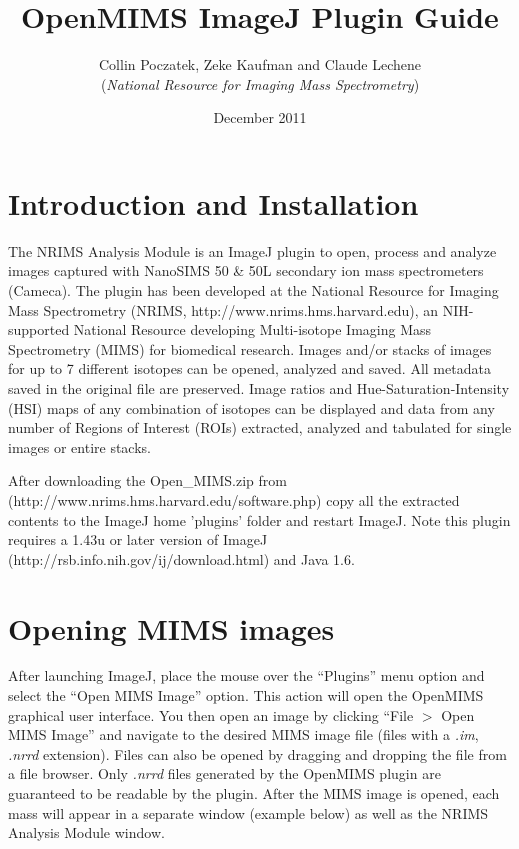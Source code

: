 \documentclass{article}
\title{\textbf{OpenMIMS ImageJ Plugin Guide}}
\date {December 2011}
\author{Collin Poczatek, Zeke Kaufman and Claude Lechene \\(\textit{National Resource for Imaging Mass Spectrometry})}
\begin{document}
\maketitle

\section*{Introduction and Installation }
	The NRIMS Analysis Module is an ImageJ plugin to open, process and analyze images captured with
	NanoSIMS 50 \& 50L secondary ion mass spectrometers (Cameca). The plugin has been developed at the
	National Resource for Imaging Mass Spectrometry (NRIMS, http://www.nrims.hms.harvard.edu), an 
	NIH-supported National Resource developing Multi-isotope Imaging Mass Spectrometry (MIMS) for
	biomedical research. Images and/or stacks of images for up to 7 different isotopes can be opened, 
	analyzed and saved. All metadata saved in the original file are preserved. Image ratios and 
	Hue-Saturation-Intensity (HSI) maps of any combination of isotopes can be displayed and data 
	from any number of Regions of Interest (ROIs) extracted, analyzed and tabulated for single images 
	or entire stacks. 

	After downloading the Open\_MIMS.zip from (http://www.nrims.hms.harvard.edu/software.php) copy all the
	extracted contents to the ImageJ home 'plugins' folder and restart ImageJ. Note this plugin requires 
	a 1.43u or later version of ImageJ (http://rsb.info.nih.gov/ij/download.html) and Java 1.6.

\section*{Opening MIMS images }
	After launching ImageJ, place the mouse over the ``Plugins'' menu option and select the 
	``Open MIMS Image''  option. This action will open the OpenMIMS graphical user interface. You 
	then open an image by clicking ``File $>$ Open MIMS Image'' and navigate to the desired
	MIMS image file (files with a \textit{.im}, \textit{.nrrd} extension). 
	Files can also be opened by dragging and dropping the file
	from a file browser. 
	Only \textit{.nrrd} files generated by the OpenMIMS plugin are guaranteed to be readable by the plugin.
	After the MIMS image is opened, each mass will appear in a separate window (example below)
	as well as the NRIMS Analysis Module window.
\end{document}
